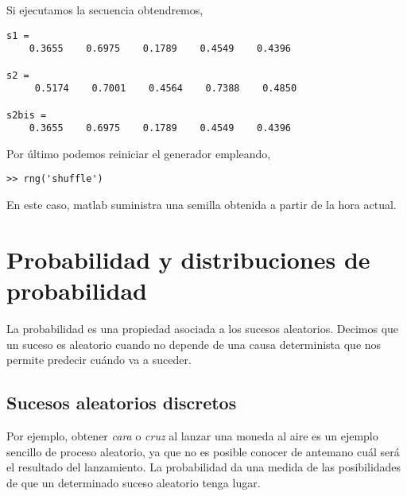 Si ejecutamos la secuencia obtendremos,

\begin{verbatim}
s1 =
    0.3655    0.6975    0.1789    0.4549    0.4396

s2 =
     0.5174    0.7001    0.4564    0.7388    0.4850
      
s2bis =
    0.3655    0.6975    0.1789    0.4549    0.4396
\end{verbatim}

Por último podemos reiniciar el generador empleando,
\begin{verbatim}
>> rng('shuffle')
\end{verbatim}
En este caso, matlab suministra una semilla obtenida a partir de la hora actual.

\section{Probabilidad y distribuciones de probabilidad}

La probabilidad es una propiedad asociada a los sucesos aleatorios. Decimos que un suceso es aleatorio cuando no depende de una causa determinista que nos permite predecir cuándo va a suceder. 

\subsection{Sucesos aleatorios discretos}
Por ejemplo, obtener \emph{cara} o \emph{cruz} al lanzar una moneda al aire es un ejemplo sencillo de proceso aleatorio, ya que no es posible conocer de antemano cuál será el resultado del lanzamiento. La probabilidad da una medida de las posibilidades de que un determinado suceso aleatorio tenga lugar.

